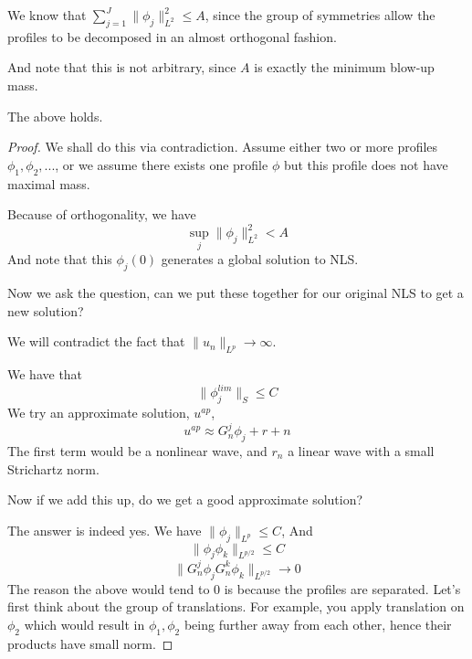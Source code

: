 \begin{remark}
    We know that $\sum_{j=1}^J\|\phi_j\|_{L^2}^2\leq A$, since the group of symmetries allow the profiles to be decomposed in an almost orthogonal fashion.
\end{remark}
And note that this is not arbitrary, since $A$ is exactly the minimum blow-up mass.
\begin{proposition}
    The above holds.
\end{proposition}
\begin{proof}
    We shall do this via contradiction. Assume either two or more profiles $\phi_1, \phi_2, ...$, or we assume there exists one profile $\phi$ but this profile does not have maximal mass.

    Because of orthogonality, we have
    \begin{equation*}
        \sup_j\|\phi_j\|_{L^2}^2<A
    \end{equation*}
    And note that this $\phi_j(0)$ generates a global solution to NLS.

    Now we ask the question, can we put these together for our original NLS to get a new solution? 
    \begin{note}
        We will contradict the fact that $\|u_n\|_{L^p}\to\infty$. 
    \end{note}
    We have that
    \begin{equation*}
        \|\phi_j^{lim}\|_S\leq C
    \end{equation*}
    We try an approximate solution, $u^{ap}$, 
    \begin{equation*}
        u^{ap}\approx G_n^j\phi_j+r+n
    \end{equation*}
    The first term would be a nonlinear wave, and $r_n$ a linear wave with a small Strichartz norm. 
    \begin{problem}
        Now if we add this up, do we get a good approximate solution?
    \end{problem}
    The answer is indeed yes. We have $\|\phi_j\|_{L^p}\leq C$, And
    \begin{equation*}
        \|\phi_j\phi_k\|_{L^{p/2}}\leq C
    \end{equation*}
    \begin{equation*}
        \|G_n^j\phi_jG_n^k\phi_k\|_{L^{p/2}}\to 0
    \end{equation*}
    The reason the above would tend to 0 is because the profiles are separated. Let's first think about the group of translations. For example, you apply translation on $\phi_2$ which would result in $\phi_1, \phi_2$ being further away from each other, hence their products have small norm.    


\end{proof}
